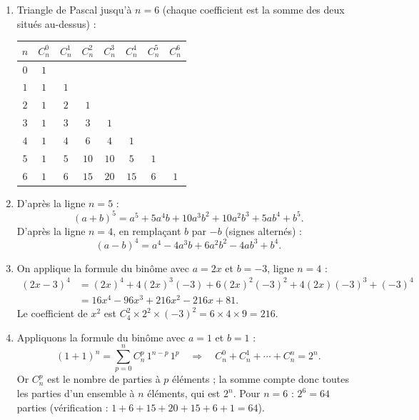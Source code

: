 \documentclass[11pt]{article}
\begin{document}
\begin{corrige}
\begin{enumerate}
\item Triangle de Pascal jusqu'à $n = 6$ (chaque coefficient est la somme des deux situés au-dessus) :
\begin{center}
\begin{tabular}{|c|c|c|c|c|c|c|c|}
\hline
\rowcolor{popblueL} $n$ & $C_n^0$ & $C_n^1$ & $C_n^2$ & $C_n^3$ & $C_n^4$ & $C_n^5$ & $C_n^6$ \\
\hline
$0$ & $1$ & & & & & & \\
$1$ & $1$ & $1$ & & & & & \\
$2$ & $1$ & $2$ & $1$ & & & & \\
$3$ & $1$ & $3$ & $3$ & $1$ & & & \\
$4$ & $1$ & $4$ & $6$ & $4$ & $1$ & & \\
$5$ & $1$ & $5$ & $10$ & $10$ & $5$ & $1$ & \\
$6$ & $1$ & $6$ & $15$ & $20$ & $15$ & $6$ & $1$ \\
\hline
\end{tabular}
\end{center}
\item D'après la ligne $n = 5$ :
\[ (a+b)^5 = a^5 + 5a^4 b + 10 a^3 b^2 + 10 a^2 b^3 + 5 a b^4 + b^5. \]
D'après la ligne $n = 4$, en remplaçant $b$ par $-b$ (signes alternés) :
\[ (a-b)^4 = a^4 - 4 a^3 b + 6 a^2 b^2 - 4 a b^3 + b^4. \]
\item On applique la formule du binôme avec $a = 2x$ et $b = -3$, ligne $n = 4$ :
\begin{align*}
(2x-3)^4 &= (2x)^4 + 4(2x)^3(-3) + 6(2x)^2(-3)^2 + 4(2x)(-3)^3 + (-3)^4 \\
&= 16x^4 - 96x^3 + 216x^2 - 216x + 81.
\end{align*}
Le coefficient de $x^2$ est $C_4^2 \times 2^2 \times (-3)^2 = 6 \times 4 \times 9 = 216$.
\item Appliquons la formule du binôme avec $a = 1$ et $b = 1$ :
\[ (1+1)^n = \sum_{p=0}^{n} C_n^p \, 1^{n-p} \, 1^p \quad \Longrightarrow \quad C_n^0 + C_n^1 + \cdots + C_n^n = 2^n. \]
Or $C_n^p$ est le nombre de parties à $p$ éléments ; la somme compte donc toutes les parties d'un ensemble à $n$ éléments, qui est $2^n$. Pour $n = 6$ : $2^6 = 64$ parties (vérification : $1+6+15+20+15+6+1 = 64$).
\end{enumerate}
\end{corrige}
\end{document}
